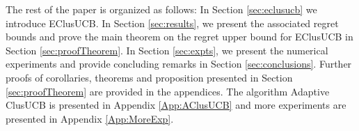 The rest of the paper is organized as follows: In Section \ref{sec:eclusucb} we introduce EClusUCB. In Section \ref{sec:results}, we present the associated regret bounds and prove the main theorem on the regret upper bound for EClusUCB in Section \ref{sec:proofTheorem}. In Section \ref{sec:expts}, we present the numerical experiments and provide concluding remarks in Section \ref{sec:conclusions}. Further proofs of corollaries, theorems and proposition presented in Section \ref{sec:proofTheorem} are provided in the appendices. The algorithm Adaptive ClusUCB is presented in Appendix \ref{App:AClusUCB} and more experiments are presented in Appendix \ref{App:MoreExp}. 
